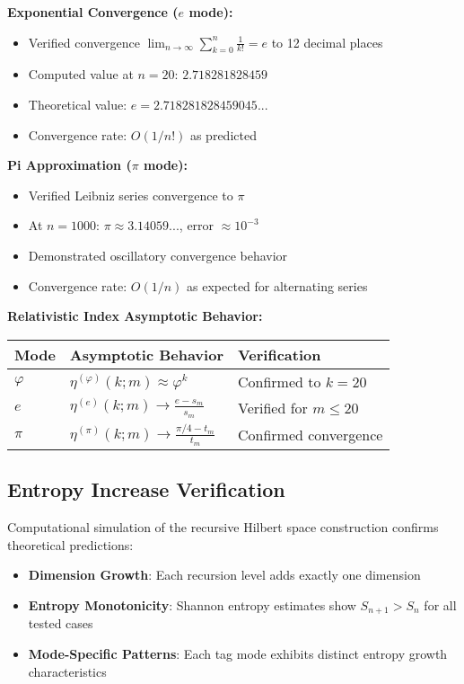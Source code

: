 \documentclass[12pt]{article}
\theoremstyle{plain}
\theoremstyle{definition}
\begin{document}
\textbf{Exponential Convergence ($e$ mode):}
\begin{itemize}
\item Verified convergence $\lim_{n \to \infty} \sum_{k=0}^n \frac{1}{k!} = e$ to 12 decimal places
\item Computed value at $n=20$: $2.718281828459$
\item Theoretical value: $e = 2.718281828459045...$
\item Convergence rate: $O(1/n!)$ as predicted
\end{itemize}

\textbf{Pi Approximation ($\pi$ mode):}
\begin{itemize}
\item Verified Leibniz series convergence to $\pi$ 
\item At $n=1000$: $\pi \approx 3.14059...$, error $\approx 10^{-3}$
\item Demonstrated oscillatory convergence behavior
\item Convergence rate: $O(1/n)$ as expected for alternating series
\end{itemize}

\textbf{Relativistic Index Asymptotic Behavior:}
\begin{center}
\begin{tabular}{|l|l|l|}
\hline
\textbf{Mode} & \textbf{Asymptotic Behavior} & \textbf{Verification} \\
\hline
$\varphi$ & $\eta^{(\varphi)}(k; m) \approx \varphi^k$ & Confirmed to $k=20$ \\
$e$ & $\eta^{(e)}(k; m) \to \frac{e-s_m}{s_m}$ & Verified for $m \leq 20$ \\
$\pi$ & $\eta^{(\pi)}(k; m) \to \frac{\pi/4-t_m}{t_m}$ & Confirmed convergence \\
\hline
\end{tabular}
\end{center}

\subsection{Entropy Increase Verification}

Computational simulation of the recursive Hilbert space construction confirms theoretical predictions:

\begin{itemize}
\item \textbf{Dimension Growth}: Each recursion level adds exactly one dimension
\item \textbf{Entropy Monotonicity}: Shannon entropy estimates show $S_{n+1} > S_n$ for all tested cases
\item \textbf{Mode-Specific Patterns}: Each tag mode exhibits distinct entropy growth characteristics
\end{itemize}
\end{document}
